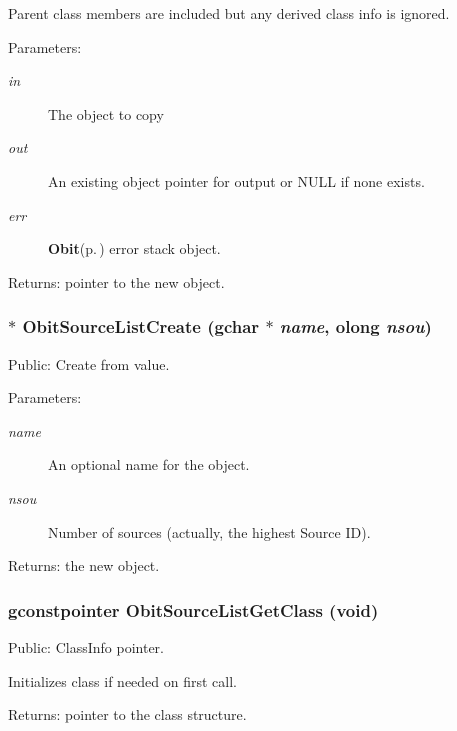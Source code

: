 Parent class members are included but any derived class info is ignored. \begin{Desc}
\item[Parameters:]
\begin{description}
\item[{\em in}]The object to copy \item[{\em out}]An existing object pointer for output or NULL if none exists. \item[{\em err}]{\bf Obit}{\rm (p.\,\pageref{structObit})} error stack object. \end{description}
\end{Desc}
\begin{Desc}
\item[Returns:]pointer to the new object. \end{Desc}
\subsubsection{$\ast$ Obit\-Source\-List\-Create (gchar $\ast$ {\em name}, {\bf olong} {\em nsou})}\label{ObitSourceList_8h_a7}


Public: Create from value. 

\begin{Desc}
\item[Parameters:]
\begin{description}
\item[{\em name}]An optional name for the object. \item[{\em nsou}]Number of sources (actually, the highest Source ID). \end{description}
\end{Desc}
\begin{Desc}
\item[Returns:]the new object. \end{Desc}
\subsubsection{\setlength{\rightskip}{0pt plus 5cm}gconstpointer Obit\-Source\-List\-Get\-Class (void)}\label{ObitSourceList_8h_a5}


Public: Class\-Info pointer. 

Initializes class if needed on first call. \begin{Desc}
\item[Returns:]pointer to the class structure. \end{Desc}
